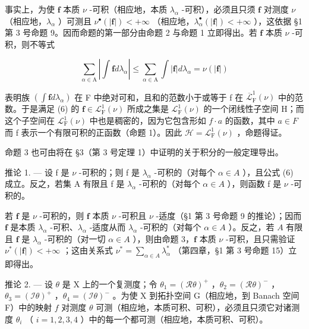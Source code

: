 事实上，为使 \(\mathbf{f}\) 本质 \(\nu\) -可积（相应地，本质 \(\lambda_{\alpha}\) -可积），必须且只须 \(\mathbf{f}\) 对测度 \(\nu\) （相应地，\(\lambda_{\alpha}\) ）可测且 \(\nu^{\bullet}(|\mathbf{f}|) < +\infty\) （相应地，\(\lambda_{\alpha}^{\bullet}(|\mathbf{f}|) < +\infty\) ），这依据 §1 第 3 号命题 9。因而命题的第一部分由命题 2 与命题 1 立即得出。若 \(\mathbf{f}\) 本质 \(\nu\) -可积，则不等式

\[
\sum_ {\alpha \in \mathrm{A}} \left| \int \mathbf {f} d \lambda_ {\alpha} \right| \leqslant \sum_ {\alpha \in \mathrm{A}} \int | \mathbf {f} | d \lambda_ {\alpha} = \nu (| \mathbf {f} |)
\]

表明族 \(\left(\int\mathbf{f}d\lambda_{\alpha}\right)\) 在 F 中绝对可和，且和的范数小于或等于 f 在 \(\overline{\mathcal{L}}_{\mathrm{F}}^{1}(\nu)\) 中的范数。于是满足 (6) 的 \(\mathbf{f}\in\mathcal{L}_{\mathrm{F}}^{1}(\nu)\) 所成之集是 \(\mathcal{L}_{\mathrm{F}}^{1}(\nu)\) 的一个闭线性子空间 H；而这个子空间在 \(\mathcal{L}_{\mathrm{F}}^{1}(\nu)\) 中也是稠密的，因为它包含形如 \(f\cdot a\) 的函数，其中 \(a\in F\) 而 f 表示一个有限可积的正函数（命题 1）。因此 \(\mathcal{H}=\mathcal{L}_{\mathrm{F}}^{1}(\nu)\) ，命题得证。

命题 3 也可由将在 §3（第 3 号定理 1）中证明的关于积分的一般定理导出。

推论 1. --- 设 f 是 \(\nu\) -可积的；则 f 是 \(\lambda_{\alpha}\) -可积的（对每个 \(\alpha \in A\) ），且公式 (6) 成立。反之，若集 A 有限且 f 是 \(\lambda_{\alpha}\) -可积的（对每个 \(\alpha \in A\) ），则函数 f 是 \(\nu\) -可积的。

若 \(\mathbf{f}\) 是 \(\nu\) -可积的，则 \(\mathbf{f}\) 本质 \(\nu\) -可积且 \(\nu\) -适度（§1 第 3 号命题 9 的推论）；因而 \(\mathbf{f}\) 是本质 \(\lambda_{\alpha}\) -可积、\(\lambda_{\alpha}\) -适度从而 \(\lambda_{\alpha}\) -可积的（对每个 \(\alpha \in A\) ）。反之，若 \(A\) 有限且 \(\mathbf{f}\) 是 \(\lambda_{\alpha}\) -可积的（对一切 \(\alpha \in A\) ），则由命题 3，\(\mathbf{f}\) 本质 \(\nu\) -可积，且只需验证 \(\nu^{*}(|\mathbf{f}|) < +\infty\) ；这由关系式 \(\nu^{*} = \sum_{\alpha \in A} \lambda_{\alpha}^{*}\) （第四章，§1 第 3 号命题 15）立即得出。

推论 2. --- 设 \(\theta\) 是 X 上的一个复测度；令 \(\theta_1 = (\mathcal{R}\theta)^+\) ，\(\theta_2 = (\mathcal{R}\theta)^-\) ，\(\theta_3 = (\mathcal{I}\theta)^+\) ，\(\theta_4 = (\mathcal{I}\theta)^-\) 。为使 X 到拓扑空间 G（相应地，到 Banach 空间 F）中的映射 \(f\) 对测度 \(\theta\) 可测（相应地，本质可积、可积），必须且只须它对诸测度 \(\theta_i\) （ \(i = 1,2,3,4\) ）中的每一个都可测（相应地，本质可积、可积）。


